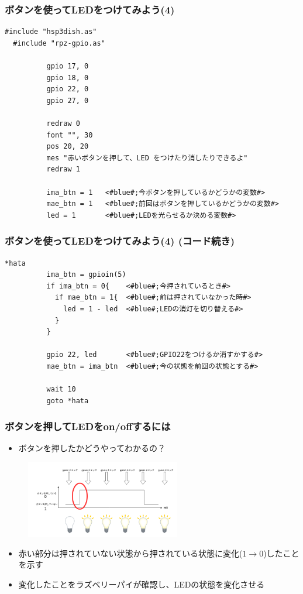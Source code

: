 \begin{frame}[fragile]
  \frametitle{ボタンを使ってLEDをつけてみよう(4)}
  \begin{lstlisting}[title=button\_led2.hsp, label=button_led2.hsp]
  #include "hsp3dish.as"
  #include "rpz-gpio.as"
  
          gpio 17, 0
          gpio 18, 0
          gpio 22, 0
          gpio 27, 0
        
          redraw 0
          font "", 30
          pos 20, 20
          mes "赤いボタンを押して、LED をつけたり消したりできるよ"
          redraw 1

          ima_btn = 1   <#blue#;今ボタンを押しているかどうかの変数#>
          mae_btn = 1   <#blue#;前回はボタンを押しているかどうかの変数#>
          led = 1       <#blue#;LEDを光らせるか決める変数#>
  \end{lstlisting}
\end{frame}

\begin{frame}[fragile]
  \frametitle{ボタンを使ってLEDをつけてみよう(4) (コード続き)}
  \begin{lstlisting}[title=button\_led2.hsp, label=button_led2.hsp]
  *hata
          ima_btn = gpioin(5)
          if ima_btn = 0{    <#blue#;今押されているとき#>
            if mae_btn = 1{  <#blue#;前は押されていなかった時#>
              led = 1 - led  <#blue#;LEDの消灯を切り替える#>
            }
          }

          gpio 22, led       <#blue#;GPIO22をつけるか消すかする#>
          mae_btn = ima_btn  <#blue#;今の状態を前回の状態とする#>

          wait 10
          goto *hata
  \end{lstlisting}
\end{frame}

\begin{frame}
  \frametitle{ボタンを押してLEDをon/offするには}
  \begin{itemize}
    \item ボタンを押したかどうやってわかるの？
  \end{itemize}
  \begin{figure}
    \centering
    \includegraphics[width=0.6\textwidth]{../images/chap03/button_push.png}
  \end{figure}
  \begin{itemize}
    \item 赤い部分は押されていない状態から押されている状態に変化($1\rightarrow0$)したことを示す
    \item 変化したことをラズベリーパイが確認し、LEDの状態を変化させる
  \end{itemize}
\end{frame}

